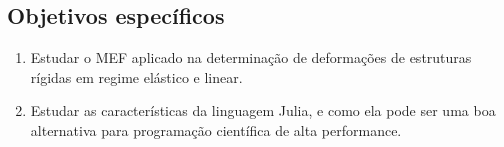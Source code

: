 \subsection{Objetivos específicos}

\begin{enumerate}
    \item Estudar o MEF aplicado na determinação de deformações de estruturas rígidas em regime elástico e linear.
    \item Estudar as características da linguagem Julia, e como ela pode ser uma boa alternativa para programação científica de alta performance.
\end{enumerate}